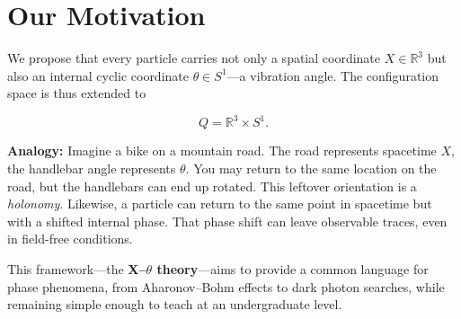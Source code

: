 \section{Our Motivation}

We propose that every particle carries not only a spatial coordinate
$X \in \mathbb{R}^3$ but also an internal cyclic coordinate $\theta \in S^1$---a vibration
angle. The configuration space is thus extended to

\[
Q = \mathbb{R}^3 \times S^1.
\]

\textbf{Analogy:} Imagine a bike on a mountain road. The road represents spacetime $X$,
the handlebar angle represents $\theta$. You may return to the same location on the road,
but the handlebars can end up rotated. This leftover orientation is a \emph{holonomy}.
Likewise, a particle can return to the same point in spacetime but with a shifted internal
phase. That phase shift can leave observable traces, even in field-free conditions.

This framework---the \textbf{X--$\theta$ theory}---aims to provide a common language for
phase phenomena, from Aharonov--Bohm effects to dark photon searches, while remaining
simple enough to teach at an undergraduate level.
